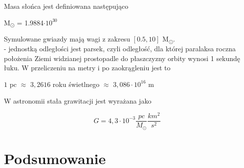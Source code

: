 \documentclass[14pt,twoside,a4paper]{article}
\begin{document}
Masa słońca jest definiowana następująco\\
\begin{center}
M\textsubscript{\(\odot\)} = 1.9884\(\cdot 10^{30}\)\\
\end{center}
Symulowane gwiazdy mają wagi z zakresu \([0.5, 10]\) M\textsubscript{\(\odot\)}.\\
- jednostką odległości jest parsek, czyli odległość, dla której paralaksa roczna położenia Ziemi widzianej prostopadle do płaszczyzny orbity wynosi 1 sekundę łuku. W przeliczeniu na metry i po zaokrągleniu jest to 
\begin{center}
\(1\) pc \(\approx\) \(3,2616\) roku świetlnego \(\approx\) \(3,086\cdot 10^{16}\) m\\
\end{center}

W astronomii stała grawitacji jest wyrażana jako 
\begin{center}
$$G = 4,3\cdot 10^{-3} \frac{pc}{M_{\odot}} \frac{km^2}{s^2}$$
\end{center}

\newpage

\section{\LARGE Podsumowanie}

\newpage

\nocite{*}
\printbibliography
\end{document}
